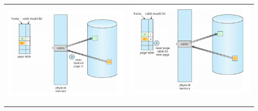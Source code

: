 \documentclass[a4paper]{scrreprt}
\begin{document}
\begin{table}
\begin{tabular}{cc}
\includegraphics[scale=0.3]{graphics/pr3.png} & \includegraphics[scale=0.3]{graphics/pr4.png} \ \\

\end{tabular}
\end{table}
\end{document}
